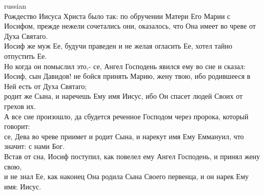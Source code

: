 \documentclass[8pt]{article} %
\begin{document}
{\begin{minipage}[t]{0.45\textwidth}
\begin{otherlanguage*}{russian}
\\
Рождество Иисуса Христа было так: по обручении Матери Его Марии с Иосифом, прежде нежели сочетались они, оказалось, что Она имеет во чреве от Духа Святаго.
\\
Иосиф же муж Ее, будучи праведен и не желая огласить Ее, хотел тайно отпустить Ее.
\\
Но когда он помыслил это,- се, Ангел Господень явился ему во сне и сказал: Иосиф, сын Давидов! не бойся принять Марию, жену твою, ибо родившееся в Ней есть от Духа Святаго;
\\
родит же Сына, и наречешь Ему имя Иисус, ибо Он спасет людей Своих от грехов их.
\\
А все сие произошло, да сбудется реченное Господом через пророка, который говорит:
\\
се, Дева во чреве приимет и родит Сына, и нарекут имя Ему Еммануил, что значит: с нами Бог.
\\
Встав от сна, Иосиф поступил, как повелел ему Ангел Господень, и принял жену свою,
\\
и не знал Ее, как наконец Она родила Сына Своего первенца, и он нарек Ему имя: Иисус.
\end{otherlanguage*}
\end{minipage}
\hfill
\begin{minipage}[t]{0.45\textwidth}


\end{minipage}}
\end{document}
